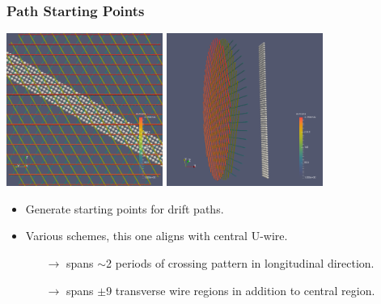 \documentclass[xcolor=dvipsnames]{beamer}
\begin{document}
\begin{frame}
  \frametitle{Path Starting Points}
  \begin{center}
    \includegraphics[height=5cm,clip,trim=0cm 0cm 0cm 0cm]{steps/ustarts1.png}%
    \includegraphics[height=5cm,clip,trim=0cm 0cm 00cm 0cm]{steps/ustarts2.png}
  \end{center}
  \begin{itemize}
  \item Generate starting points for drift paths.  
  \item Various schemes, this one aligns with central U-wire.
    \begin{itemize}\footnotesize
    \item[$\rightarrow$] spans $\sim$2 periods of crossing pattern in longitudinal direction.
    \item[$\rightarrow$] spans $\pm$9 transverse wire regions in addition to central region.
    \end{itemize}
  \end{itemize}
  
\end{frame}
\end{document}
